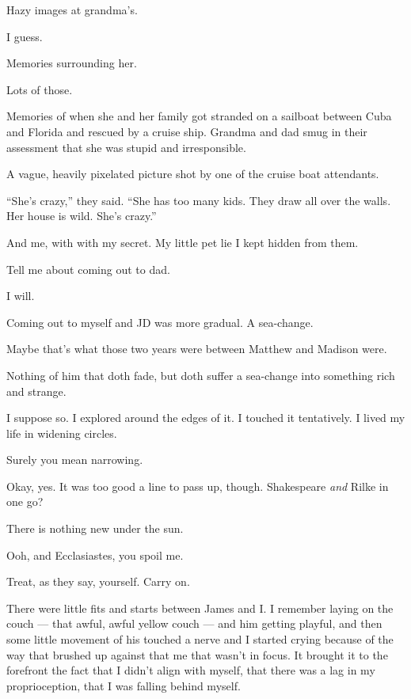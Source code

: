 \begin{paracol}{2}
\begin{leftcolumn}
\begin{ally}
Hazy images at grandma's.
\end{ally}
I guess.

\begin{ally}
Memories surrounding her.
\end{ally}
Lots of those.

\begin{ally}
Memories of when she and her family got stranded on a sailboat between Cuba and Florida and rescued by a cruise ship. Grandma and dad smug in their assessment that she was stupid and irresponsible.
\end{ally}
A vague, heavily pixelated picture shot by one of the cruise boat attendants.

\begin{ally}
``She's crazy,'' they said. ``She has too many kids. They draw all over the walls. Her house is wild. She's crazy.''
\end{ally}
And me, with with my secret. My little pet lie I kept hidden from them.

\begin{ally}
Tell me about coming out to dad.
\end{ally}
I will.
\newpage

\noindent Coming out to myself and JD was more gradual. A sea-change.

\begin{ally}
Maybe that's what those two years were between Matthew and Madison were.
\end{ally}
Nothing of him that doth fade, but doth suffer a sea-change into something rich and strange.

I suppose so. I explored around the edges of it. I touched it tentatively. I lived my life in widening circles.

\begin{ally}
Surely you mean narrowing.
\end{ally}
Okay, yes. It was too good a line to pass up, though. Shakespeare \emph{and} Rilke in one go?

\begin{ally}
There is nothing new under the sun.
\end{ally}
Ooh, and Ecclasiastes, you spoil me.

\begin{ally}
Treat, as they say, yourself. Carry on.
\end{ally}
There were little fits and starts between James and I. I remember laying on the couch --- that awful, awful yellow couch --- and him getting playful, and then some little movement of his touched a nerve and I started crying because of the way that brushed up against that me that wasn't in focus. It brought it to the forefront the fact that I didn't align with myself, that there was a lag in my proprioception, that I was falling behind myself.


\end{leftcolumn}
\end{paracol}
